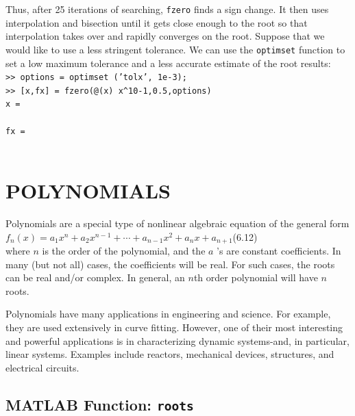 \documentclass[../main.tex]{subfiles}
\begin{document}
\begin{example}
    Thus, after 25 iterations of searching, \texttt{fzero} finds a sign change. It then uses interpolation
    and bisection until it gets close enough to the root so that interpolation takes over and
    rapidly converges on the root.
    Suppose that we would like to use a less stringent tolerance. We can use the \texttt{optimset}
    function to set a low maximum tolerance and a less accurate estimate of the root results:\\

    \texttt{>> options = optimset ('tolx', 1e-3);\\
    \indent >> [x,fx] = fzero(@(x) x\textasciicircum10-1,0.5,options)\\
    \indent x =\\
    \indent{}\\
    \indent fx =\\
    \indent{}\\}
\end{example}
\bigskip

\newpage
\section[POLYNOMIALS]{POLYNOMIALS}

\noindent Polynomials are a special type of nonlinear algebraic equation of the general form\\

$f_{n}(x)=a_{1} x^{n}+a_{2} x^{n-1}+\cdots+a_{n-1} x^{2}+a_{n} x+a_{n+1}$\hfill (6.12)\\

\noindent where $n$ is the order of the polynomial, and the $a$ 's are constant coefficients. In many (but not all) cases, the coefficients will be real. For such cases, the roots can be real and/or complex. In general, an $n$th order polynomial will have $n$ roots.

Polynomials have many applications in engineering and science. For example, they are used extensively in curve fitting. However, one of their most interesting and powerful applications is in characterizing dynamic systems-and, in particular, linear systems. Examples include reactors, mechanical devices, structures, and electrical circuits.

\subsection{MATLAB Function: \texttt{roots}}
\end{document}
